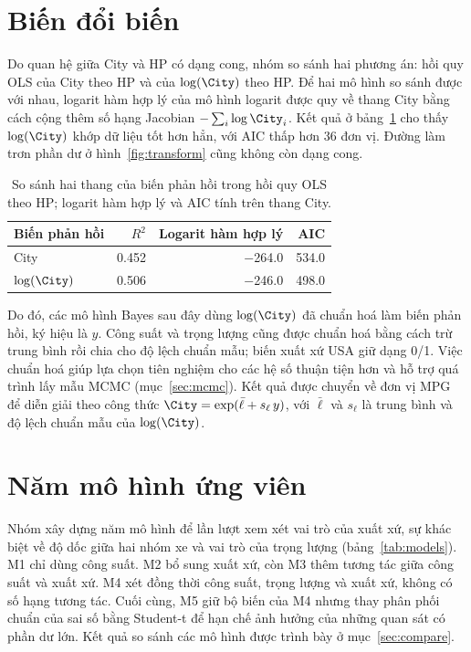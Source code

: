 \documentclass[12pt,a4paper]{report}
\begin{document}
\section{Biến đổi biến}
\label{sec:transform}

Do quan hệ giữa City và HP có dạng cong, nhóm so sánh hai phương án: hồi quy OLS
của City theo HP và của $\log(\City)$ theo HP. Để hai mô hình so sánh được với
nhau, logarit hàm hợp lý của mô hình logarit được quy về thang City bằng cách
cộng thêm số hạng Jacobian $-\sum_i \log \City_i$. Kết quả ở
bảng~\ref{tab:transform} cho thấy $\log(\City)$ khớp dữ liệu tốt hơn hẳn, với
AIC thấp hơn 36 đơn vị. Đường làm trơn phần dư ở hình~\ref{fig:transform} cũng
không còn dạng cong.

\begin{table}[tp]
  \centering
  \caption{So sánh hai thang của biến phản hồi trong hồi quy OLS theo HP;
    logarit hàm hợp lý và AIC tính trên thang City.}
  \label{tab:transform}
  \begin{tabular}{lrrr}
    \toprule
    Biến phản hồi & $R^2$ & Logarit hàm hợp lý & AIC \\
    \midrule
    City         & \num{0.452} & \num{-264.0} & \num{534.0} \\
    $\log(\City)$ & \num{0.506} & \num{-246.0} & \num{498.0} \\
    \bottomrule
  \end{tabular}
\end{table}


Do đó, các mô hình Bayes sau đây dùng $\log(\City)$ đã chuẩn hoá làm biến phản
hồi, ký hiệu là $y$. Công suất và trọng lượng cũng được chuẩn hoá bằng cách
trừ trung bình rồi chia cho độ lệch chuẩn mẫu; biến xuất xứ USA giữ dạng 0/1.
Việc chuẩn hoá giúp lựa chọn tiên nghiệm cho các hệ số thuận tiện hơn và hỗ trợ
quá trình lấy mẫu MCMC (mục~\ref{sec:mcmc}). Kết quả được chuyển về đơn vị MPG để diễn giải theo công thức
$\City = \exp(\bar{\ell} + s_\ell\, y)$, với $\bar{\ell}$ và $s_\ell$ là trung
bình và độ lệch chuẩn mẫu của $\log(\City)$.

\section{Năm mô hình ứng viên}
\label{sec:candidates}

Nhóm xây dựng năm mô hình để lần lượt xem xét vai trò của xuất xứ, sự khác
biệt về độ dốc giữa hai nhóm xe và vai trò của trọng lượng
(bảng~\ref{tab:models}). M1 chỉ dùng công suất. M2 bổ sung xuất xứ, còn M3 thêm
tương tác giữa công suất và xuất xứ. M4 xét đồng thời công suất, trọng lượng và
xuất xứ, không có số hạng tương tác. Cuối cùng, M5 giữ bộ biến của M4 nhưng
thay phân phối chuẩn của sai số bằng Student-t để hạn chế ảnh hưởng của những quan
sát có phần dư lớn. Kết quả so sánh các mô hình được trình bày ở
mục~\ref{sec:compare}.
\end{document}
